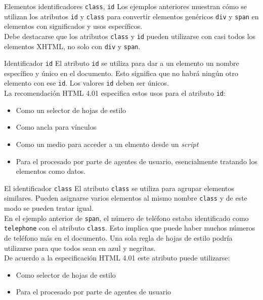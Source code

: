 \begin{frame}{Elementos identificadores \texttt{class}, \texttt{id}} %
    Los ejemplos anteriores muestran cómo se utilizan los atributos \texttt{id}
    y \texttt{class} para convertir elementos genéricos \texttt{div} y
    \texttt{span} en elementos con significados y usos específicos. \\[0.5cm]

    Debe destacarse que los atributos \texttt{class} y \texttt{id} pueden
    utilizarse con casi todos los elementos XHTML, no solo con \texttt{div} y
    \texttt{span}. 
\end{frame}

\begin{frame}{Identificador \texttt{id}} %
    El atributo \texttt{id} se utiliza para dar a un elemento un nombre
    específico y único en el documento. Esto significa que no habrá ningún otro
    elemento con ese \texttt{id}. Los valores \texttt{id} deben ser únicos. \\
    La recomendación HTML 4.01 especifica estos usos para el atributo
    \texttt{id}: 

    \begin{itemize}
        \item Como un selector de hojas de estilo
        \item Como ancla para vínculos 
        \item Como un medio para acceder a un elmento desde un \textit{script}
        \item Para el procesado por parte de agentes de usuario, esencialmente
        tratando los elementos como datos.
    \end{itemize}

\end{frame}

\begin{frame}{El identificador \texttt{class}} %
    El atributo \texttt{class} se utiliza para agrupar elementos similares.
    Pueden asignarse varios elementos al mismo nombre \texttt{class} y de este
    modo se pueden tratar igual. \\
    En el ejemplo anterior de \texttt{span}, el número de teléfono estaba
    identificado como \texttt{telephone} con el atributo \texttt{class}. Esto
    implica que puede haber muchos números de teléfono más en el documento. Una
    sola regla de hojas de estilo podría utilizarse para que todos sean en azul
    y negritas. \\
    De acuerdo a la especificación HTML 4.01 este atributo puede utilizarse: 

    \begin{itemize}
        \item Como selector de hojas de estilo
        \item Para el procesado por parte de agentes de usuario
    \end{itemize}
\end{frame}


